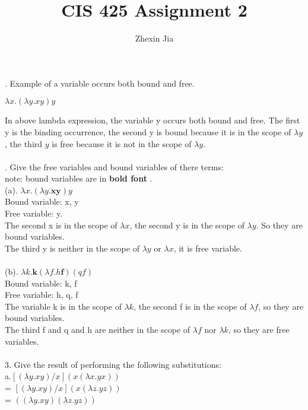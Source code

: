 \documentclass[12pt]{article}
\begin{document}
\title{CIS 425 Assignment 2}
\author{Zhexin Jia}
\maketitle

. Example of a variable occurs both bound and free.
\begin{center}
$\lambda x.(\lambda y.xy)y$
\end{center}
In above lambda expression, the variable y occurs both bound and free. The first y is the binding occurrence, the second y is bound because it is in the scope of $\lambda y$, the third $y$ is free because it is not in the scope of $\lambda y$.\\
\vspace{1mm}\\
. Give the free variables and bound variables of there terms:\\
note: bound variables are in \textbf{bold font} .\\
(a). $\lambda x.(\lambda y.\mathbf{xy})y$\\
Bound variable: x, y\\
Free variable: y. \\
The second x is in the scope of $\lambda x$, the second y is in the scope of $\lambda y$. So they are bound variables.\\
The third y is neither in the scope of $\lambda y$ or $\lambda x$, it is free variable.\\
\vspace{1mm}\\
(b). $\lambda k.\mathbf{k}(\lambda f.h\mathbf{f})(qf)$\\
Bound variable: k, f\\
Free variable: h, q, f\\
The variable k is in the scope of $\lambda k$, the second f is in the scope of $\lambda f$, so they are bound variables.\\
The third f and q and h are neither in the scope of $\lambda f$ nor $\lambda k$, so they are free variables.\\
\vspace{1mm}\\
3. Give the result of performing the following substitutions:\\
a.$[(\lambda y.xy)/x](x(\lambda x.yx))$\\
= $[(\lambda y.xy)/x](x(\lambda z.yz))$\\
= $((\lambda y.xy)(\lambda z.yz))$\\
\end{document}

